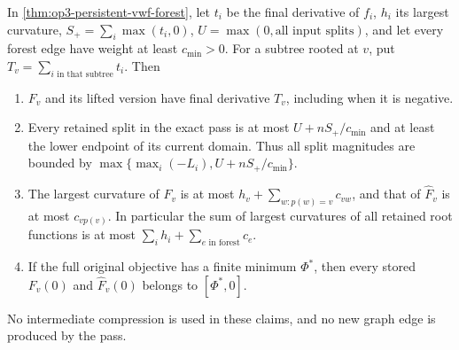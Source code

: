 \begin{proposition}
\label{prop:op3-vwf-forest-ranges}
In \cref{thm:op3-persistent-vwf-forest}, let $t_i$ be the final derivative
of $f_i$, $h_i$ its largest curvature, $S_+=\sum_i\max(t_i,0)$,
$U=\max(0,\text{all input splits})$, and let every forest edge have
weight at least $c_{\min}>0$. For a subtree rooted at $v$, put
$T_v=\sum_{i\text{ in that subtree}}t_i$. Then
\begin{enumerate}
\item $F_v$ and its lifted version have final derivative $T_v$, including
when it is negative.
\item Every retained split in the exact pass is at most
$U+nS_+/c_{\min}$ and at least the lower endpoint of its current domain.
Thus all split magnitudes are bounded by
$\max\{\max_i(-L_i),U+nS_+/c_{\min}\}$.
\item The largest curvature of $F_v$ is at most
$h_v+\sum_{w:p(w)=v}c_{vw}$, and that of $\widehat F_v$ is at most
$c_{vp(v)}$. In particular the sum of largest curvatures of all retained
root functions is at most $\sum_i h_i+\sum_{e\text{ in forest}}c_e$.
\item If the full original objective has a finite minimum $\Phi^*$,
then every stored $F_v(0)$ and $\widehat F_v(0)$ belongs to $[\Phi^*,0]$.
\end{enumerate}
No intermediate compression is used in these claims, and no new graph
edge is produced by the pass.
\end{proposition}
